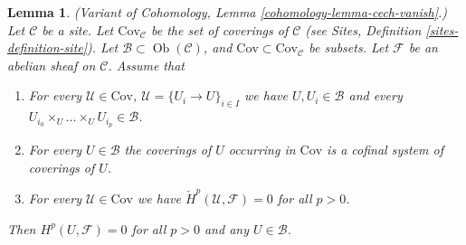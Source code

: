 \documentclass[10pt,a4paper]{amsart}
\theoremstyle{plain}
\newtheorem{lemma}[subsection]{Lemma}
\theoremstyle{definition}
\theoremstyle{remark}
\numberwithin{equation}{subsection}
\def\Ob{\mathop{\mathrm{Ob}}\nolimits}
\begin{document}
\begin{lemma}
\label{lemma-cech-vanish-collection}
(Variant of Cohomology, Lemma \ref{cohomology-lemma-cech-vanish}.)
Let $\mathcal{C}$ be a site. Let $\text{Cov}_\mathcal{C}$ be the set
of coverings of $\mathcal{C}$ (see
Sites, Definition \ref{sites-definition-site}). Let
$\mathcal{B} \subset \Ob(\mathcal{C})$, and
$\text{Cov} \subset \text{Cov}_\mathcal{C}$
be subsets. Let $\mathcal{F}$ be an abelian sheaf on $\mathcal{C}$.
Assume that
\begin{enumerate}
\item For every $\mathcal{U} \in \text{Cov}$,
$\mathcal{U} = \{U_i \to U\}_{i \in I}$ we have
$U, U_i \in \mathcal{B}$ and every
$U_{i_0} \times_U \ldots \times_U U_{i_p} \in \mathcal{B}$.
\item For every $U \in \mathcal{B}$ the coverings of $U$
occurring in $\text{Cov}$ is a cofinal system of coverings of $U$.
\item For every $\mathcal{U} \in \text{Cov}$ we have
$\check{H}^p(\mathcal{U}, \mathcal{F}) = 0$ for all $p > 0$.
\end{enumerate}
Then $H^p(U, \mathcal{F}) = 0$ for all $p > 0$ and any $U \in \mathcal{B}$.
\end{lemma}
\end{document}
